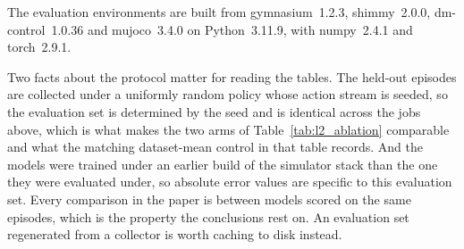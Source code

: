 \documentclass[10pt]{article} %
\begin{document}
The evaluation environments are built from gymnasium~1.2.3, shimmy~2.0.0,
dm-control~1.0.36 and mujoco~3.4.0 on Python~3.11.9, with numpy~2.4.1 and
torch~2.9.1.

Two facts about the protocol matter for reading the tables. The held-out
episodes are collected under a uniformly random policy whose action stream is
seeded, so the evaluation set is determined by the seed and is identical across
the jobs above, which is what makes the two arms of Table~\ref{tab:l2_ablation}
comparable and what the matching dataset-mean control in that table records. And
the models were trained under an earlier build of the simulator stack than the
one they were evaluated under, so absolute error values are specific to this
evaluation set. Every comparison in the paper is between models scored on the
same episodes, which is the property the conclusions rest on. An evaluation set
regenerated from a collector is worth caching to disk instead.
\end{document}
